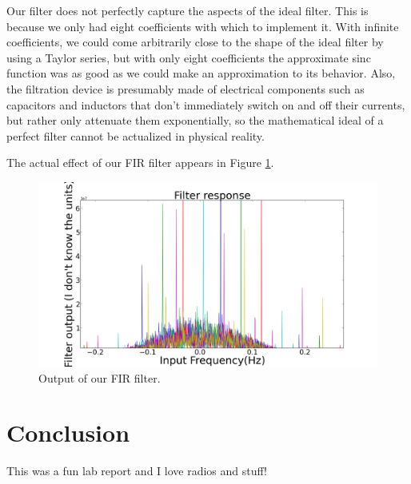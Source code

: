 \documentclass[11pt]{article}
\begin{document}
Our filter does not perfectly capture the aspects of the ideal filter. This is because we only had eight coefficients with which to implement it. With infinite coefficients, we could come arbitrarily close to the shape of the ideal filter by using a Taylor series, but with only eight coefficients the approximate sinc function was as good as we could make an approximation to its behavior. Also, the filtration device is presumably made of electrical components such as capacitors and inductors that don't immediately switch on and off their currents, but rather only attenuate them exponentially, so the mathematical ideal of a perfect filter cannot be actualized in physical reality. 

The actual effect of our FIR filter appears in Figure \ref{fir}. %

\begin{figure}
\centering
\includegraphics[scale=0.35]{pictures/fir}
\caption{Output of our FIR filter. \label{fir}}
\end{figure}



\section{Conclusion}
This was a fun lab report and I love radios and stuff! %

\end{document}
